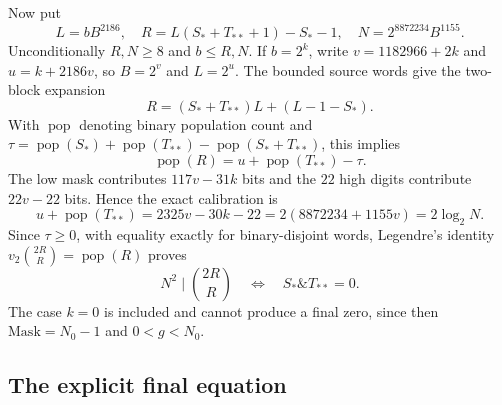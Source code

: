 Now put
\[
 L=bB^{2186},\quad
 R=L(S_*+T_{**}+1)-S_*-1,\quad
 N=2^{8872234}B^{1155}.
\]
Unconditionally $R,N\ge8$ and $b\le R,N$.  If $b=2^k$, write
$v=1182966+2k$ and $u=k+2186v$, so $B=2^v$ and $L=2^u$.
The bounded source words give the two-block expansion
\[
 R=(S_*+T_{**})L+(L-1-S_*).
\]
With $\operatorname{pop}$ denoting binary population count and
$\tau=\operatorname{pop}(S_*)+\operatorname{pop}(T_{**})
-\operatorname{pop}(S_*+T_{**})$, this implies
\[
 \operatorname{pop}(R)=u+\operatorname{pop}(T_{**})-\tau.
\]
The low mask contributes $117v-31k$ bits and the $22$ high digits
contribute $22v-22$ bits.  Hence the exact calibration is
\[
 u+\operatorname{pop}(T_{**})=2325v-30k-22
 =2(8872234+1155v)=2\log_2N.
\]
Since $\tau\ge0$, with equality exactly for binary-disjoint words,
Legendre's identity
$v_2\binom{2R}{R}=\operatorname{pop}(R)$ proves
\[
 N^2\mid\binom{2R}{R}
 \quad\Longleftrightarrow\quad S_*\mathbin{\&}T_{**}=0.
\]
The case $k=0$ is included and cannot produce a final zero, since then
$\mathrm{Mask}=N_0-1$ and $0<g<N_0$.

\subsection{The explicit final equation}

